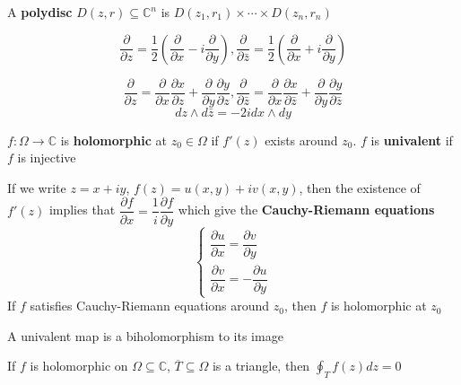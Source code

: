 \documentclass[main]{subfiles}
\begin{document}
\begin{definition}
A \textbf{polydisc} $D(z,r)\subseteq\mathbb C^n$ is $D(z_1,r_1)\times\cdots\times D(z_n,r_n)$
\end{definition}

\begin{definition}
\[\frac{\partial}{\partial z}=\frac{1}{2}\left(\dfrac{\partial }{\partial x}-i\dfrac{\partial }{\partial y}\right), \frac{\partial}{\partial \bar z}=\frac{1}{2}\left(\dfrac{\partial }{\partial x}+i\dfrac{\partial }{\partial y}\right)\]
\end{definition}

\begin{note}
\[\dfrac{\partial}{\partial z}=\dfrac{\partial}{\partial x}\dfrac{\partial x}{\partial z}+\dfrac{\partial}{\partial y}\dfrac{\partial y}{\partial z}, \dfrac{\partial}{\partial \bar z}=\dfrac{\partial}{\partial x}\dfrac{\partial x}{\partial \bar z}+\dfrac{\partial}{\partial y}\dfrac{\partial y}{\partial \bar z}\]
\[dz\wedge d\bar z=-2idx\wedge dy\]
\end{note}

\begin{definition}
$f:\Omega\to\mathbb C$ is \textbf{holomorphic} at $z_0\in\Omega$ if $f'(z)$ exists around $z_0$. $f$ is \textbf{univalent} if $f$ is injective
\end{definition}

\begin{theorem}
If we write $z=x+iy$, $f(z)=u(x,y)+iv(x,y)$, then the existence of $f'(z)$ implies that $\dfrac{\partial f}{\partial x}=\dfrac{1}{i}\dfrac{\partial f}{\partial y}$ which give the \textbf{Cauchy-Riemann equations}
\[\begin{cases}
\dfrac{\partial u}{\partial x}=\dfrac{\partial v}{\partial y} \\
\dfrac{\partial v}{\partial x}=-\dfrac{\partial u}{\partial y}
\end{cases}\]
If $f$ satisfies Cauchy-Riemann equations around $z_0$, then $f$ is holomorphic at $z_0$
\end{theorem}

\begin{lemma}
A univalent map is a biholomorphism to its image
\end{lemma}

\begin{theorem}[Goursat]
If $f$ is holomorphic on $\Omega\subseteq\mathbb C$, $\overline T\subseteq\Omega$ is a triangle, then $\displaystyle\oint_T f(z)dz=0$
\end{theorem}
\end{document}
